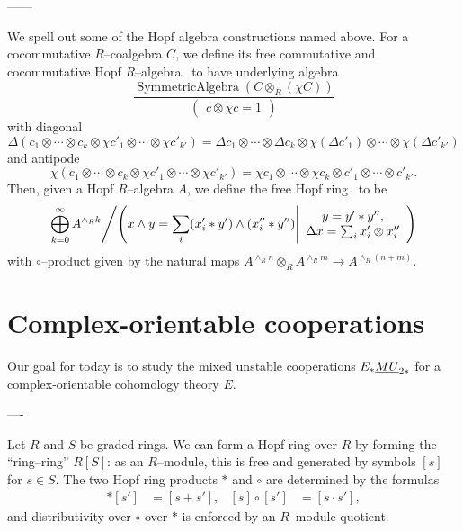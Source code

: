 ------


\begin{definition}
We spell out some of the Hopf algebra constructions named above.  For a cocommutative $R$--coalgebra $C$, we define its free commutative and cocommutative Hopf $R$--algebra~\cite{Takeuchi} to have underlying algebra \[\frac{\operatorname{SymmetricAlgebra} \left(C \otimes_R (\chi C)\right)}{\left( \begin{array}{c} c \otimes \chi c = 1 \end{array} \right)}\] with diagonal \[\Delta(c_1 \otimes \cdots \otimes c_k \otimes \chi c'_1 \otimes \cdots \otimes \chi c'_{k'}) = \Delta c_1 \otimes \cdots \otimes \Delta c_k \otimes \chi (\Delta c'_1) \otimes \cdots \otimes \chi(\Delta c'_{k'})\] and antipode \[\chi(c_1 \otimes \cdots \otimes c_k \otimes \chi c'_1 \otimes \cdots \otimes \chi c'_{k'}) = \chi c_1 \otimes \cdots \otimes \chi c_k \otimes c'_1 \otimes \cdots \otimes c'_{k'}.\]  Then, given a Hopf $R$--algebra $A$, we define the free Hopf ring~\cite[Definition 4.2, Proposition 2.16]{HuntonTurner} to be \[\left. \bigoplus_{k=0}^\infty A^{\wedge_R k} \middle/ \left(x \wedge y = \sum_i (x'_i \ast y') \wedge (x''_i \ast y'') \middle| \begin{array}{c} y = y' \ast y'', \\ \Delta x = \sum_i x'_i \otimes x''_i \end{array} \right) \right.\] with $\circ$--product given by the natural maps $A^{\wedge_R n} \otimes_R A^{\wedge_R m} \to A^{\wedge_R (n+m)}$.
\end{definition}











\section{Complex-orientable cooperations}

Our goal for today is to study the mixed unstable cooperations $E_* \underline{\smash{MU}}_{2*}$ for a complex-orientable cohomology theory $E$.

----


Let $R$ and $S$ be graded rings.  We can form a Hopf ring over $R$ by forming the ``ring--ring'' $R[S]$: as an $R$--module, this is free and generated by symbols $[s]$ for $s \in S$.  The two Hopf ring products $\ast$ and $\circ$ are determined by the formulas
\begin{align*}
[s] \ast [s'] & = [s + s'], &
[s] \circ [s'] & = [s \cdot s'],
\end{align*}
and distributivity over $\circ$ over $\ast$ is enforced by an $R$--module quotient.

